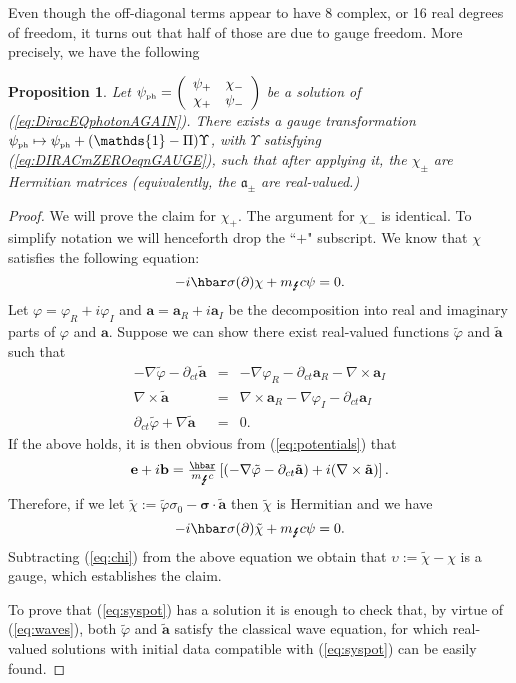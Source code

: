 \documentclass[11pt]{article}
\newtheorem{prop}[thm]{Proposition}
\theoremstyle{definition}
\newcommand{\refeq}[1]{(\ref{#1})}
\numberwithin{equation}{section}
\newcommand{\fa}{\mathfrak{a}}
\newcommand{\bb}{\mathbf{b}}
\newcommand{\ba}{\mathbf{a}}
\newcommand{\bfa}{\boldsymbol{\fa}}
\newcommand{\be}{\mathbf{e}}
\newcommand{\beq}{\begin{equation}}
\newcommand{\eeq}{\end{equation}}
\newcommand{\Id}{\mathds{1}}
\newcommand{\p}{\partial}
\newcommand{\siV}{\boldsymbol{\sigma}}
\newcommand{\psiPH}{{\psi_{\mbox{\rm\tiny ph}}}}
\newcommand{\mPH}{{m_{\mbox{\Lightning}}}}
\newcommand{\si}{\sigma}
\newcommand{\nab}{\nabla}
\newcommand{\bna}{\begin{eqnarray}}
\newcommand{\ena}{\end{eqnarray}}
\begin{document}
Even though the off-diagonal terms appear to have 8 complex, or 16 real degrees of freedom, 
it turns out that half of those are due to gauge freedom. 
 More precisely, we have the following
\begin{prop}
Let $\psiPH = \left(\begin{array}{cc} \psi_+ & \chi_-\\ \chi_+ & \psi_- \end{array} \right)$ be a solution of \refeq{eq:DiracEQphotonAGAIN}. 
 There exists a gauge transformation $\psiPH \mapsto \psiPH + (\Id - \Pi)\Upsilon$, with $\Upsilon$ satisfying \refeq{eq:DIRACmZEROeqnGAUGE},
 such that after applying it, the $\chi_\pm$ are Hermitian matrices (equivalently, 
the $\bfa_\pm$ are real-valued.)
\end{prop}
\begin{proof}
 We will prove the claim for $\chi_+$. 
 The argument for $\chi_-$ is identical. 
 To simplify notation we will henceforth drop the ``$+$" subscript. 
We know that $\chi$ satisfies the following equation:
\beq\label{eq:chi}
-i\hbar \si(\p) \chi + \mPH c \psi = 0.
\eeq
Let $\varphi= \varphi_R + i\varphi_I$ and $\ba =\ba_R + i \ba_I$  be the decomposition into real and imaginary parts of $\varphi$ and $\ba$. 
 Suppose we can show there exist real-valued functions $\tilde{\varphi}$ and $\tilde{\ba}$ such that 
\bna
-\nab \tilde{\varphi} - \p_{ct} \tilde{\ba} & = & - \nab \varphi_R - \p_{ct} \ba_R - \nab \times \ba_I \nonumber\\
\nab \times \tilde{\ba} & = & \nab \times \ba_R - \nab \varphi_I - \p_{ct} \ba_I \label{eq:syspot} \\
\p_{ct} \tilde{\varphi} + \nab \tilde{\ba} & = & 0. \nonumber
\ena
 If the above holds, it is then obvious from \refeq{eq:potentials} that 
\beq
\be+i \bb = \tfrac{\hbar}{\mPH c}\left[ (-\nab \tilde{\varphi} - \p_{ct} \tilde{\ba}) + i ( \nab \times \tilde{\ba})\right].
\eeq
 Therefore, if we let $\tilde{\chi} := \tilde{\varphi} \si_0 - \siV \cdot \tilde{\ba}$ then $\tilde{\chi}$ is Hermitian and we have 
\beq
-i\hbar \si(\p)\tilde{\chi} + \mPH c \psi = 0.
\eeq
Subtracting \refeq{eq:chi} from the above equation we obtain that $\upsilon := \tilde{\chi} - \chi$ is a gauge, which establishes the claim.

To prove that \refeq{eq:syspot} has a solution it is enough to check that, by virtue of \refeq{eq:waves}, both $\tilde{\varphi}$ and 
$\tilde{\ba}$ satisfy the classical wave equation, for which real-valued solutions with initial data compatible with \refeq{eq:syspot} 
can be easily found. 
\end{proof}
\end{document}
